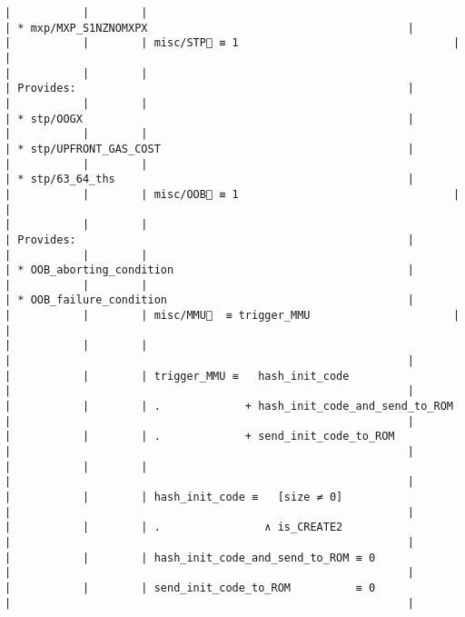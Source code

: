 \documentclass[varwidth=\maxdimen,margin=0.5cm,multi={verbatim}]{standalone}
\begin{document}
\begin{verbatim}
|           |        |                                                | * mxp/MXP_S1NZNOMXPX                                        |
|           |        | misc/STP🚩 ≡ 1                                 |                                                             |
|           |        |                                                | Provides:                                                   |
|           |        |                                                | * stp/OOGX                                                  |
|           |        |                                                | * stp/UPFRONT_GAS_COST                                      |
|           |        |                                                | * stp/63_64_ths                                             |
|           |        | misc/OOB🚩 ≡ 1                                 |                                                             |
|           |        |                                                | Provides:                                                   |
|           |        |                                                | * OOB_aborting_condition                                    |
|           |        |                                                | * OOB_failure_condition                                     |
|           |        | misc/MMU🚩  ≡ trigger_MMU                      |                                                             |
|           |        |                                                |                                                             |
|           |        | trigger_MMU ≡   hash_init_code                 |                                                             |
|           |        | .             + hash_init_code_and_send_to_ROM |                                                             |
|           |        | .             + send_init_code_to_ROM          |                                                             |
|           |        |                                                |                                                             |
|           |        | hash_init_code ≡   [size ≠ 0]                  |                                                             |
|           |        | .                ∧ is_CREATE2                  |                                                             |
|           |        | hash_init_code_and_send_to_ROM ≡ 0             |                                                             |
|           |        | send_init_code_to_ROM          ≡ 0             |                                                             |

\end{verbatim}
\end{document}
